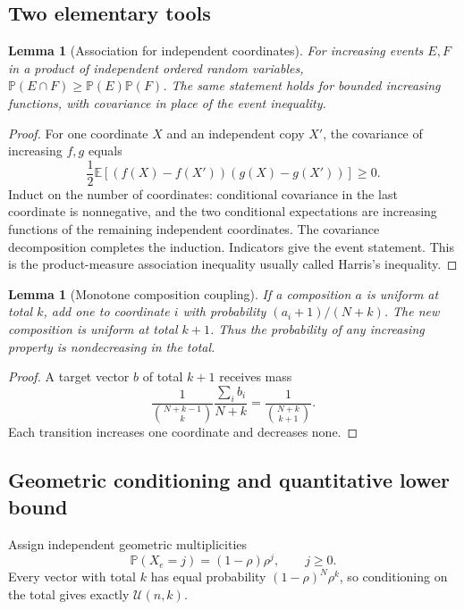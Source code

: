 \documentclass[11pt,letterpaper]{article}
\newtheorem{lemma}[theorem]{Lemma}
\theoremstyle{remark}\newtheorem{remark}[theorem]{Remark}
\newcommand{\Prob}{\mathbb P}\newcommand{\E}{\mathbb E}
\newcommand{\U}{\mathcal U}\newcommand{\dd}{\,\mathrm d}
\begin{document}
\subsection{Two elementary tools}
\begin{lemma}[Association for independent coordinates]\label{lfm:lem:harris}
For increasing events $E,F$ in a product of independent ordered random variables, $\Prob(E\cap F)\ge\Prob(E)\Prob(F)$. The same statement holds for bounded increasing functions, with covariance in place of the event inequality.
\end{lemma}
\begin{proof}
For one coordinate $X$ and an independent copy $X'$, the covariance of increasing $f,g$ equals
\[
 \frac12\E[(f(X)-f(X'))(g(X)-g(X'))]\ge0.
\]
Induct on the number of coordinates: conditional covariance in the last coordinate is nonnegative, and the two conditional expectations are increasing functions of the remaining independent coordinates. The covariance decomposition completes the induction. Indicators give the event statement. This is the product-measure association inequality usually called Harris's inequality.
\end{proof}

\begin{lemma}[Monotone composition coupling]\label{lfm:lem:couple}
If a composition $a$ is uniform at total $k$, add one to coordinate $i$ with probability $(a_i+1)/(N+k)$. The new composition is uniform at total $k+1$. Thus the probability of any increasing property is nondecreasing in the total.
\end{lemma}
\begin{proof}
A target vector $b$ of total $k+1$ receives mass
\[
 \frac1{\binom{N+k-1}{k}}\frac{\sum_i b_i}{N+k}
 =\frac1{\binom{N+k}{k+1}}.
\]
Each transition increases one coordinate and decreases none.
\end{proof}

\subsection{Geometric conditioning and quantitative lower bound}
Assign independent geometric multiplicities
\[
 \Prob(X_e=j)=(1-\rho)\rho^j,\qquad j\ge0.
\]
Every vector with total $k$ has equal probability $(1-\rho)^N\rho^k$, so conditioning on the total gives exactly $\U(n,k)$.
\end{document}
